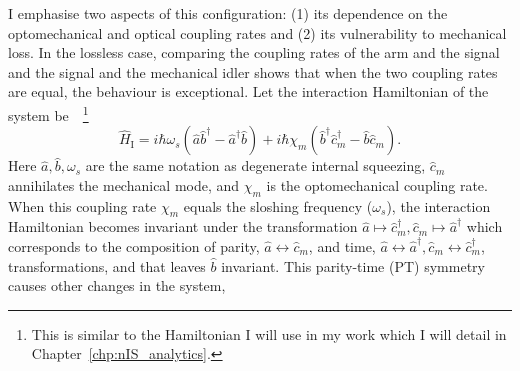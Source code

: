 I emphasise two aspects of this configuration: (1) its dependence on the optomechanical and optical coupling rates and (2) its vulnerability to mechanical loss. %
In the lossless case, comparing the coupling rates of the arm and the signal and the signal and the mechanical idler shows that when the two coupling rates are equal, the behaviour is exceptional.
Let the interaction Hamiltonian of the system be~\cite{}~\footnote{This is similar to the Hamiltonian I will use in my work which I will detail in Chapter~\ref{chp:nIS_analytics}.}
\begin{equation}\label{eq:sWLC_HI}
\hat{H}_\text{I}=i\hbar\omega_s(\hat{a}\hat{b}^\dag-\hat{a}^\dag\hat{b})+i\hbar\chi_m(\hat{b}^\dag\hat{c}_m^\dag-\hat{b}\hat{c}_m).
\end{equation}
Here $\hat a, \hat b, \omega_s$ are the same notation as degenerate internal squeezing, $\hat{c}_m$ annihilates the mechanical mode, and $\chi_m$ is the optomechanical coupling rate. When this coupling rate $\chi_m$ equals the sloshing frequency ($\omega_s$), the interaction Hamiltonian becomes invariant under the transformation $\hat a\mapsto\hat{c}_m^\dag, \hat{c}_m\mapsto\hat a^\dag$ which corresponds to the composition of parity, $\hat a\leftrightarrow \hat{c}_m$, and time, $\hat a\leftrightarrow \hat a^\dag,\hat {c}_m\leftrightarrow \hat {c}_m^\dag$, transformations, and that leaves $\hat b$ invariant. This parity-time (PT) symmetry causes other changes in the system, 
